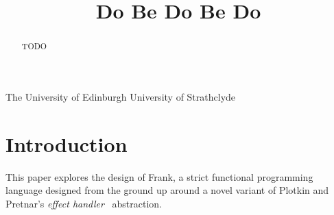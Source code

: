 \documentclass[preprint]{sigplanconf}
\begin{document}


\title{Do Be Do Be Do}

           {The University of Edinburgh}
           {}
           {University of Strathclyde}
           {}

\maketitle



\begin{abstract}
TODO
\end{abstract}


\section{Introduction}

This paper explores the design of Frank, a strict functional
programming language designed from the ground up around a novel
variant of Plotkin and Pretnar's \emph{effect
  handler}~\cite{PlotkinP09, PlotkinP13} abstraction.
\end{document}

